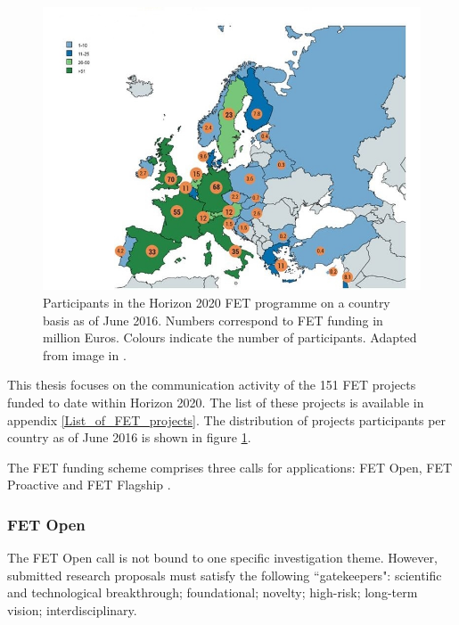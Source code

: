 \begin{figure}[!t] 
 \begin{center}
 \includegraphics[scale=0.3]{Images/Country_participation_in_H2020_FET_projects.jpg}
 \caption{Participants in the Horizon 2020 FET programme on a country basis as of June 2016. Numbers correspond to FET funding in million Euros. Colours indicate the number of participants. Adapted from image in \cite{FETParticipation}.}
 \label{Country_participation_in_H2020_FET_projects}
 \end{center}
\end{figure}

This thesis focuses on the communication activity of the 151 FET projects funded to date within Horizon 2020. The list of these projects is available in appendix \ref{List_of_FET_projects}. The distribution of projects participants per country as of June 2016 is shown in figure \ref{Country_participation_in_H2020_FET_projects}.

The FET funding scheme comprises three calls for applications: FET Open, FET Proactive and FET Flagship \cite{FETOpen,FETProactive,FETFlagship}.

\subsubsection{FET Open}
The FET Open call is not bound to one specific investigation theme. However, submitted research proposals must satisfy the following ``gatekeepers": scientific and technological breakthrough; foundational; novelty; high-risk; long-term vision; interdisciplinary. 

